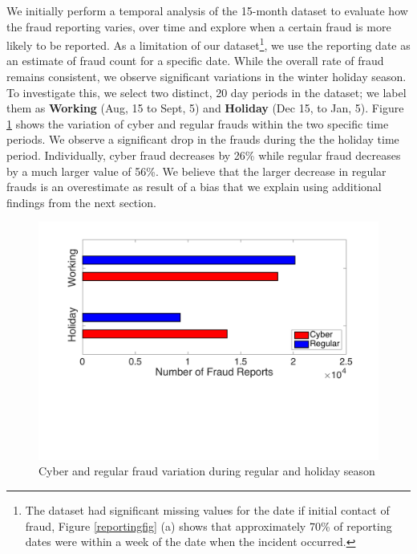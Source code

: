 \documentclass[conference]{IEEEtran}
\begin{document}
We initially perform a temporal analysis of the 15-month dataset to evaluate how the fraud reporting varies, over time and explore when a certain fraud is more likely to be reported. As a limitation of our dataset\footnote{The dataset had significant missing values for the date if initial contact of fraud, Figure \ref{reportingfig} (a) shows that approximately 70\% of reporting dates were within a week of the date when the incident occurred.}, we use the reporting date as an estimate of fraud count for a specific date. While the overall rate of fraud remains consistent, we observe significant variations in the winter holiday season. To investigate this, we select two distinct, 20 day periods in the dataset; we label them as \textbf{Working} (Aug, 15  to Sept, 5) and \textbf{Holiday} (Dec 15, to Jan, 5). Figure \ref{temporal} shows the variation of cyber and regular frauds within the two specific time periods. We observe a significant drop in the frauds during the the holiday time period. Individually, cyber fraud decreases by 26\% while  regular fraud decreases by a much larger value of 56\%. We believe that the larger decrease in regular frauds is an overestimate as result of a bias that we explain using additional findings from the next section.

\begin{figure}[t]
\centering
  \includegraphics[scale=0.35]{graphics/reg_vs_holiday.pdf}
  \caption{Cyber and regular fraud variation during regular and holiday season}
  \label{temporal}
\end{figure}
\end{document}
